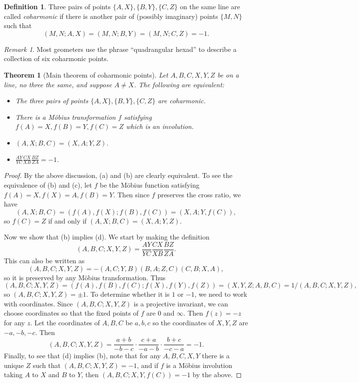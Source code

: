 \documentclass[letterpaper,11pt]{article}
\newtheorem{thm}{Theorem}
\theoremstyle{definition}
\newtheorem{defn}{Definition}
\theoremstyle{remark}
\newtheorem{rmk}{Remark}
\begin{document}
\begin{defn} Three pairs of points $\{A,X\}, \{B,Y\}, \{C,Z\}$ on the same line are called \emph{coharmonic} if there is another pair of (possibly imaginary) points $\{M,N\}$ such that
\[
(M,N;A,X) = (M,N;B,Y) = (M,N;C,Z) = -1.
\]
\end{defn}

\begin{rmk} Most geometers use the phrase ``quadrangular hexad'' to describe a collection of six coharmonic points.
\end{rmk}

\begin{thm}[Main theorem of coharmonic points]\label{coharmonic} Let $A,B,C,X,Y,Z$ be on a line, no three the same, and suppose $A\ne X$. The following are equivalent:
\begin{itemize}
\item[\rm (a)] The three pairs of points $\{A,X\}, \{B,Y\}, \{C,Z\}$ are coharmonic.
\item[\rm (b)] There is a M\"obius transformation $f$ satisfying $f(A) = X, f(B) = Y, f(C) = Z$ which is an involution.
\item[\rm (c)] $(A,X;B,C) = (X,A;Y,Z)$.
\item[\rm (d)] $\frac{AY}{YC}\frac{CX}{XB}\frac{BZ}{ZA} = -1$.
\end{itemize}
\end{thm}
\begin{proof} By the above discussion, (a) and (b) are clearly equivalent. To see the equivalence of (b) and (c), let $f$ be the M\"obius function satisfying $f(A) = X, f(X) = A, f(B) = Y$. Then since $f$ preserves the cross ratio, we have
\[
(A,X;B,C) = (f(A),f(X);f(B),f(C)) = (X,A;Y,f(C)),
\]
so $f(C) = Z$ if and only if $(A,X;B,C) = (X,A;Y,Z)$.

Now we show that (b) implies (d). We start by making the definition
\[
(A,B,C;X,Y,Z) = \frac{AY}{YC}\frac{CX}{XB}\frac{BZ}{ZA}.
\]
This can also be written as
\[
(A,B,C;X,Y,Z) = -(A,C;Y,B)(B,A;Z,C)(C,B;X,A),
\]
so it is preserved by any M\"obius transformation. Thus
\[
(A,B,C;X,Y,Z) = (f(A),f(B),f(C);f(X),f(Y),f(Z)) = (X,Y,Z;A,B,C) = 1/(A,B,C;X,Y,Z),
\]
so $(A,B,C;X,Y,Z) = \pm 1$. To determine whether it is $1$ or $-1$, we need to work with coordinates. Since $(A,B,C;X,Y,Z)$ is a projective invariant, we can choose coordinates so that the fixed points of $f$ are $0$ and $\infty$. Then $f(z) = -z$ for any $z$. Let the coordinates of $A,B,C$ be $a,b,c$ so the coordinates of $X,Y,Z$ are $-a, -b, -c$. Then
\[
(A,B,C;X,Y,Z) = \frac{a+b}{-b-c}\cdot\frac{c+a}{-a-b}\cdot\frac{b+c}{-c-a} = -1.
\]
Finally, to see that (d) implies (b), note that for any $A,B,C,X,Y$ there is a unique $Z$ such that $(A,B,C;X,Y,Z) = -1$, and if $f$ is a M\"obius involution taking $A$ to $X$ and $B$ to $Y$, then $(A,B,C;X,Y,f(C)) = -1$ by the above.
\end{proof}
\end{document}
